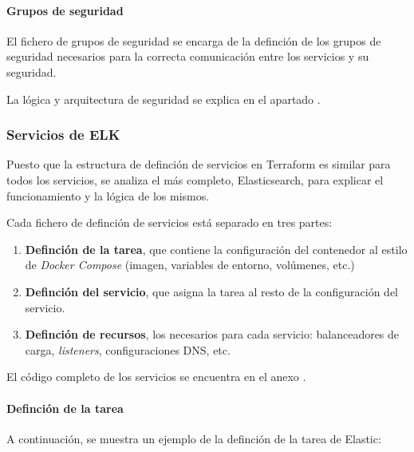 \paragraph{Grupos de seguridad}
El fichero de grupos de seguridad  se encarga
de la definción de los grupos de seguridad necesarios para la correcta
comunicación entre los servicios y su seguridad.

La lógica y arquitectura de seguridad se explica en el apartado
.


\newpage{}
\subsubsection{Servicios de ELK}
Puesto que la estructura de definción de servicios en Terraform es similar para
todos los servicios, se analiza el más completo, Elasticsearch, para explicar el
funcionamiento y la lógica de los mismos.

Cada fichero de definción de servicios está separado en tres partes:
\begin{enumerate}
	\item \textbf{Definción de la tarea}, que contiene la configuración del
		contenedor al estilo de \textit{Docker Compose} (imagen, variables de
    entorno, volúmenes, etc.)
	\item \textbf{Definción del servicio}, que asigna la tarea al resto de la
		configuración del servicio.
	\item \textbf{Definción de recursos}, los necesarios para cada servicio:
		balanceadores de carga, \textit{listeners}, configuraciones DNS, etc.
\end{enumerate}

El código completo de los servicios se encuentra en el anexo .

\paragraph{Definción de la tarea}
A continuación, se muestra un ejemplo de la definción de la tarea de Elastic:

